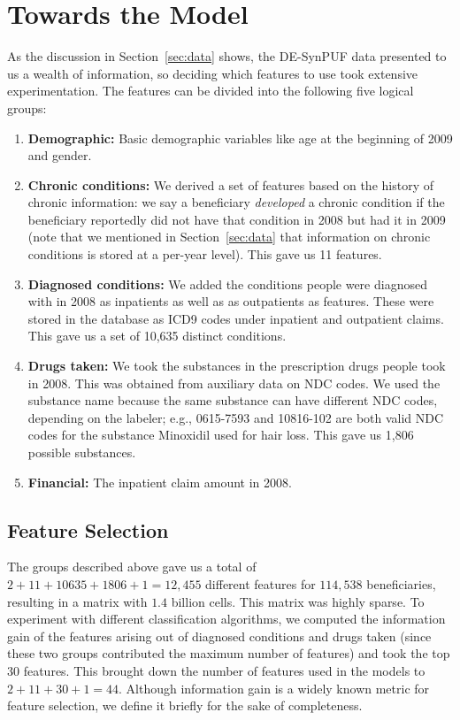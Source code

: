 \section{Towards the Model}
\label{sec:towardsmodel}
As the discussion in Section~\ref{sec:data} shows, the DE-SynPUF data presented to us a wealth of information, so deciding which features to use took extensive experimentation. The features can be divided into the following five logical groups:
\begin{enumerate}
\item {\bf Demographic: } Basic demographic variables like age at the beginning of 2009 and gender.
\item {\bf Chronic conditions: }We derived a set of features based on the history of chronic information: we say a beneficiary {\em developed} a chronic condition if the beneficiary reportedly did not have that condition in 2008 but had it in 2009 (note that we mentioned in Section~\ref{sec:data} that information on chronic conditions is stored at a per-year level). This gave us 11 features.
\item {\bf Diagnosed conditions: }We added the conditions people were diagnosed with in 2008 as inpatients as well as as outpatients as features. These were stored in the database as ICD9 codes under inpatient and outpatient claims. This gave us a set of 10,635 distinct conditions. 
\item {\bf Drugs taken: }We took the substances in the prescription drugs people took in 2008. This was obtained from auxiliary data on NDC codes. We used the substance name because the same substance can have different NDC codes, depending on the labeler; e.g., 0615-7593 and 10816-102 are both valid NDC codes for the substance Minoxidil used for hair loss. This gave us 1,806 possible substances.
\item {\bf Financial: } The inpatient claim amount in 2008.
\end{enumerate}

\subsection{Feature Selection}
\label{subsec:featuresel}
The groups described above gave us a total of $2 + 11 + 10635 + 1806 + 1 = 12,455$ different features for $114,538$ beneficiaries, resulting in a matrix with $1.4$ billion cells. This matrix was highly sparse. To experiment with different classification algorithms, we computed the information gain of the features arising out of diagnosed conditions and drugs taken (since these two groups contributed the maximum number of features) and took the top 30 features. This brought down the number of features used in the models to $2 + 11 + 30 + 1 = 44$. Although information gain is a widely known metric for feature selection, we define it briefly for the sake of completeness.\\

